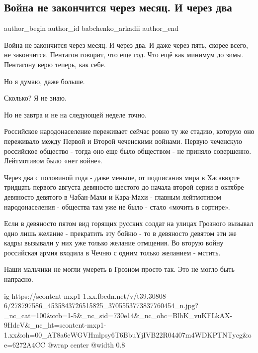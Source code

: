  
 
 
 
 
 
\subsection{Война не закончится через месяц. И через два}
\label{sec:22_04_2022.fb.babchenko_arkadii.1.vojna_ne_zakonchitsja}
 
\ifcmt
 author_begin
   author_id babchenko_arkadii
 author_end
\fi

Война не закончится через месяц. И через два. И даже через пять, скорее всего,
не закончится. Пентагон говорит, что еще год. Что ещё как минимум до зимы.
Пентагону верю теперь, как себе. 

Но я думаю, даже больше. 


Сколько? Я не знаю. 

Но не завтра и не на следующей неделе точно. 

Российское народонаселение переживает сейчас ровно ту же стадию, которую оно
переживало между Первой и Второй чеченскими войнами. Первую чеченскую
российское общество - тогда оно еще было обществом - не приняло совершенно.
Лейтмотивом было «нет войне». 

Через два с половиной года - даже меньше, от подписания мира в Хасавюрте
тридцать первого августа девяносто шестого до начала второй серии в октябре
девяносто девятого в Чабан-Махи и Кара-Махи - главным лейтмотивом
народонаселения - общества там уже не было - стало «мочить в сортире». 

Если в девяносто пятом вид горящих русских солдат на улицах Грозного вызывал
одно лишь желание - прекратить эту бойню - то в девяносто девятом эти же кадры
вызывали у них уже только желание отмщения. Во вторую войну российская армия
входила в Чечню с одним только желанием - мстить. 

Наши мальчики не могли умереть в Грозном просто так. Это не могло быть
напрасно. 

\ifcmt
  ig https://scontent-mxp1-1.xx.fbcdn.net/v/t39.30808-6/278797586_4535843726515825_3705553773837760454_n.jpg?_nc_cat=100&ccb=1-5&_nc_sid=730e14&_nc_ohc=BlhK_vuKFLkAX-9HdcV&_nc_ht=scontent-mxp1-1.xx&oh=00_AT8a6eWGVHmlpsy6T6BbuYjIVB22R04407m4WDKPTNTycg&oe=6272A4CC
  @wrap center
  @width 0.8
\fi

